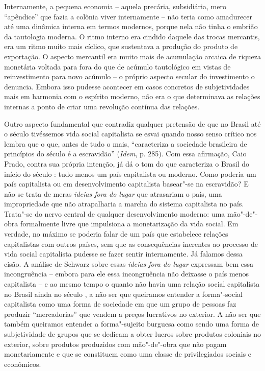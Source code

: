 {Internamente, a pequena economia -- aquela precária, subsidiária, mero
``apêndice'' que fazia a colônia viver internamente -- não teria como
amadurecer até uma dinâmica interna em termos modernos, porque nela não
tinha o embrião da tautologia moderna. O ritmo interno era cindido
daquele das trocas mercantis, era um ritmo muito mais cíclico, que
sustentava a produção do produto de exportação. O aspecto mercantil era
muito mais de acumulação arcaica de riqueza monetária voltada para fora
do que de acúmulo tautológico em vistas de reinvestimento para novo
acúmulo -- o próprio aspecto secular do investimento o denuncia. Embora
isso pudesse acontecer em casos concretos de subjetividades mais em
harmonia com o espírito moderno, não era o que determinava as relações
internas a ponto de criar uma revolução contínua das relações.

Outro aspecto fundamental que contradiz qualquer pretensão de que no
Brasil até o século  tivéssemos vida social capitalista se esvai
quando nosso senso crítico nos lembra que o que, antes de tudo o mais,
``caracteriza a sociedade brasileira de princípios do século  é a
escravidão'' (\emph{Idem}, p. 285). Com essa afirmação, Caio Prado,
contra sua própria intenção, já dá o tom do que caracteriza o Brasil do
início do século : tudo menos um país capitalista ou moderno. Como
poderia um país capitalista ou em desenvolvimento capitalista basear"-se
na escravidão? E não se trata de meras \emph{ideias fora do lugar} que
atrasariam o país, uma impropriedade que não atrapalharia a marcha do
sistema capitalista no país. Trata"-se do nervo central de qualquer
desenvolvimento moderno: uma mão"-de"-obra formalmente livre que
impulsiona a monetarização da vida social. Em verdade, no máximo se
poderia falar de um país que estabelece relações capitalistas com outros
países, sem que as consequências inerentes ao processo de vida social
capitalista pudesse se fazer sentir internamente. Já falamos dessa
cisão. A análise de Schwarz sobre essas \emph{ideias fora do lugar}
expressam bem essa incongruência -- embora para ele essa incongruência
não deixasse o país menos capitalista -- e ao mesmo tempo o quanto não
havia uma relação social capitalista no Brasil ainda no século , a
não ser que queiramos entender a forma"-social capitalista como uma forma
de sociedade em que um grupo de pessoas faz produzir ``mercadorias'' que
vendem a preços lucrativos no exterior. A não ser que também queiramos
entender a forma"-sujeito burguesa como sendo uma forma de subjetividade
de grupos que se dedicam a obter lucros sobre produtos coloniais no
exterior, sobre produtos produzidos com mão"-de"-obra que não pagam
monetariamente e que se constituem como uma classe de privilegiados
sociais e econômicos.

}
